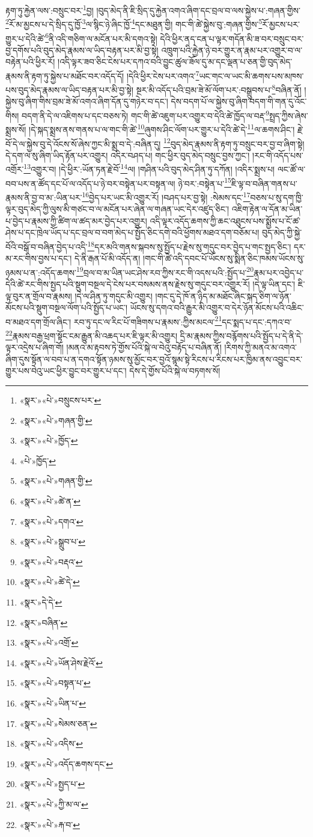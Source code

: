 རྟག་ཏུ་རྐྱེན་ལས་:བསྲུང་བར་\footnote{«སྣར་»«པེ་»བསྲུངས་པར་}བྱ། །བུད་མེད་ནི་ཇི་སྲིད་དུ་རྐྱེན་འགའ་ཞིག་དང་བྲལ་བ་ལས་སྐྱེས་པ་:གཞན་གྱིས་\footnote{«སྣར་»«པེ་»གཞན་གྱི་}རོ་མ་མྱངས་པ་དེ་སྲིད་དུ་ཁྱོ་\footnote{«སྣར་»«པེ་»ཁྱོད་}ལ་སྙིང་ཉེ་ཞིང་ཁྱོ་\footnote{«པེ་»ཁྱོད་}དང་མཐུན་གྱི། གང་གི་ཚེ་སྐྱེས་བུ་:གཞན་གྱིས་\footnote{«སྣར་»«པེ་»གཞན་གྱི་}རོ་མྱངས་པར་གྱུར་པ་དེའི་ཚེ་\footnote{«སྣར་»«པེ་»ཚེ་ན་}ནི་འདི་གཅིག་ལ་མངོན་པར་མི་དགའ་སྟེ། དེའི་ཕྱིར་ནད་ངན་པ་ལྟར་གདོན་མི་ཟ་བར་བསྲུང་བར་བྱ་དགོས་པའི་བུད་མེད་རྣམས་ལ་ཡིད་བརྟན་པར་མི་བྱ་སྟེ། འཁྲུག་པའི་རྐྱེན་ཉེ་བར་གྱུར་ན་རྣམ་པར་འགྱུར་བ་ལ་བརྟེན་པའི་ཕྱིར་རོ། །འདི་ལྟར་ཟབ་ཅིང་ངེས་པར་དཀའ་བའི་བྱུང་ཚུལ་ཟོལ་དུ་མ་དང་ལྡན་པ་ཅན་གྱི་བུད་མེད་རྣམས་ནི་རྟག་ཏུ་སྐྱེས་པ་མཐོང་བར་འདོད་དོ། །དེའི་ཕྱིར་ངེས་པར་འགའ་\footnote{«སྣར་»«པེ་»དགའ་}ཡང་གང་ལ་ཡང་མི་ཆགས་པས་མཁས་པས་བུད་མེད་རྣམས་ལ་ཡིད་བརྟན་པར་མི་བྱ་སྟེ། སྔར་མི་འདོད་པའི་བྲམ་ཟེ་མོ་ལོག་པར་:བསྒྲུབས་པ་\footnote{«སྣར་»«པེ་»སྒྲུབ་པ་}བཞིན་ནོ། །སྐྱེས་བུ་ཞིག་གིས་བྲམ་ཟེ་མོ་འགའ་ཞིག་དོན་དུ་གཉེར་བ་དང་། དེས་བདག་པོ་ལ་སྐྱེས་བུ་ཞིག་བདག་གི་གན་དུ་འོང་གིས། བདག་ནི་དེ་ལ་འཇིགས་པ་དང་བཅས་ཏེ། གང་གི་ཚེ་འཇུག་པར་འགྱུར་བ་དེའི་ཚེ་ཁྱོད་ལ་བརྡ་\footnote{«སྣར་»«པེ་»བརྡའ་}སྤྲད་ཀྱིས་ཞེས་སྨྲས་སོ། །དེ་སྐད་སྨྲས་ནས་གནས་པ་ལ་གང་གི་ཚེ་\footnote{«སྣར་»«པེ་»ཚེ་དེ་}ཞུགས་ཤིང་ལོག་པར་གྱུར་པ་དེའི་ཚེ་དེ་\footnote{«སྣར་»དེ་དེ་}ལ་ཆགས་ཤིང་། རྗེ་བོ་དེ་ལ་སྐྱེས་བུ་དེ་འོངས་སོ་ཞེས་ཀྱང་མི་སྨྲ་བ་དེ་:བཞིན་དུ། \footnote{«སྣར་»བཞིན་}བུད་མེད་རྣམས་ནི་རྟག་ཏུ་བསྲུང་བར་བྱ་བ་ཞིག་སྟེ། དེ་དག་ལ་སུ་ཞིག་ཡིད་རྟོན་པར་འགྱུར། འདིར་བཤད་པ། གང་ཕྱིར་བུད་མེད་བསྲུང་བྱས་ཀྱང་། །རང་གི་འདོད་པས་འགྲོར་\footnote{«སྣར་»«པེ་»འགྲོ་}འགྱུར་བ། །དེ་ཕྱིར་:ཡོན་ཏན་རྗེ་བོ་\footnote{«སྣར་»«པེ་»ཡོན་ཤེས་རྗེའོ་}ལ། །གཤིན་པའི་བུད་མེད་ཤིན་ཏུ་དཀོན། །འདིར་སྨྲས་པ། ལང་ཚོ་ལ་བབ་པས་ན་ཚོད་དང་པོ་ལ་འདོད་པ་ཉེ་བར་བསྟེན་པར་བསྟན་ལ། ཉེ་བར་:བསྟེན་པ་\footnote{«སྣར་»«པེ་»བསྟན་པ་}ཇི་ལྟ་བ་བཞིན་གནས་པ་རྣམས་ནི་བྱ་བ་མ་:ཡིན་པར་\footnote{«སྣར་»«པེ་»ཡིན་པ་}བྱེད་པར་ཡང་མི་འགྱུར་རོ། །བཤད་པར་བྱ་སྟེ། :སེམས་དང་\footnote{«སྣར་»«པེ་»སེམས་ཅན་}བཅས་པ་སུ་དག་ཁྱི་ལྟར་བུད་མེད་ཀྱི་ལུས་མི་གཙང་བ་ལ་མངོན་པར་ཞེན་ལ་གཞན་ཡང་དེར་འཛུད་ཅིང་། འཇིག་རྟེན་ལ་དོན་མ་ཡིན་པ་བྱེད་པ་རྣམས་ཀྱི་ཚིག་ལ་ཚད་མར་བྱེད་པར་འགྱུར། འདི་ལྟར་འདོད་ཆགས་ཀྱི་ཆང་འཐུངས་པས་སྨྱོས་པ་ངོ་ཚ་ཤེས་པ་དང་ཁྲེལ་ཡོད་པ་དང་བྲལ་བ་བག་མེད་པ་སྤྱོད་ཅིང་དགེ་བའི་ཕྱོགས་མཐའ་དག་བཅོམ་པ། བུད་མེད་ཀྱི་སྐྱེ་བོའི་བསྒོ་བ་བཞིན་བྱེད་པ་འདི་\footnote{«སྣར་»«པེ་»འདིས་}དར་མའི་གནས་སྐབས་སུ་སྤྱོད་པ་རྗེས་སུ་གདུང་བར་བྱེད་པ་གང་སྤྱད་ཅིང་། དར་མ་རང་གིས་བྱས་པ་དང་། དེ་ནི་རྒན་པོ་མི་འདོད་ན། །གང་གི་ཚེ་འདི་དབང་པོ་ཡོངས་སུ་སྨིན་ཅིང་ཁམས་ཡོངས་སུ་ཉམས་པ་ན་:འདོད་ཆགས་\footnote{«སྣར་»«པེ་»འདོད་ཆགས་དང་}བྲལ་བ་མ་ཡིན་ཡང་ཤེས་རབ་ཀྱིས་རང་གི་འདས་པའི་:སྤྱོད་པ་\footnote{«སྣར་»«པེ་»སྤྱད་པ་}རྣམ་པར་འབྱེད་པ་དེའི་ཚེ་རང་གིས་སྤྱད་པའི་སྡུག་བསྔལ་དེ་ངེས་པར་བསམས་ནས་རྗེས་སུ་གདུང་བར་འགྱུར་རོ། །དེ་ལྟ་ཡིན་དང་། ཇི་ལྟ་བུར་ན་གྲོལ་བ་རྣམས། །དེ་ལ་ཤིན་ཏུ་གདུང་མི་འགྱུར། །གང་དུ་དེ་ཁོ་ན་ཉིད་མ་མཐོང་ཞིང་སྐད་ཅིག་ལ་ཉོན་མོངས་པའི་སྡུག་བསྔལ་ལོག་པའི་སྤྱོད་པ་ཡང་། ཡོངས་སུ་དགའ་བའི་རྒྱུར་མི་འགྱུར་བ་དེར་ཉོན་མོངས་པའི་འཆིང་བ་མཐའ་དག་གྲོལ་ཞིང་། རབ་ཏུ་དང་ལ་རིང་པོ་གཟིགས་པ་རྣམས་:ཀྱིས་མངལ་\footnote{«སྣར་»«པེ་»ཀྱི་མ་ལ་}དང་སྨད་པ་དང་:དཀའ་བ་\footnote{«སྣར་»«པེ་»རྐ་བ་}རྣམས་བརྒྱ་ཕྲག་སྟོང་ངམ་རྒྱུན་མི་འཆད་པར་ཇི་ལྟར་མི་འགྱུར། དྲི་མ་རྣམས་ཀྱིས་བརྙོགས་པའི་སྤྱོད་པ་དེ་ནི་དེ་ལྟར་འདྲེས་པ་ཞིག་གོ། །མནའ་མ་རྟབས་ཏེ་གྱོས་པོའི་སྐེ་ལ་བེའུ་བརྟོད་པ་བཞིན་ནོ། །རིགས་ཀྱི་མནའ་མ་འགའ་ཞིག་དུས་སྟོན་ལ་བབ་པ་ན་དགའ་སྟོན་ཉམས་སུ་མྱོང་བར་བྱའོ་སྙམ་སྟེ་རིངས་པ་རིངས་པར་ཁྱིམ་ནས་འབྱུང་བར་གྱུར་པས་བེའུ་ཡང་ཕྱིར་བྱུང་བར་གྱུར་པ་དང་། དེས་དེ་གྱོས་པོའི་སྐེ་ལ་བཏགས་སོ། 